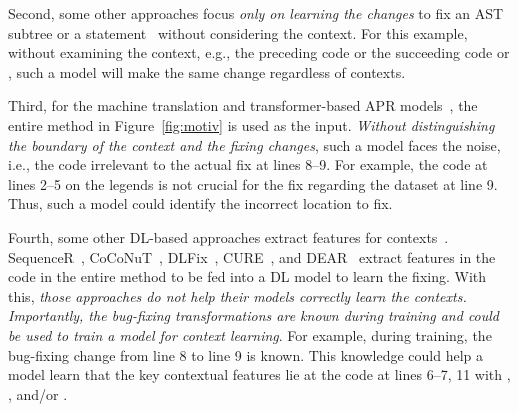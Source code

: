 Second, some other approaches focus {\em only
  on learning the changes} to fix an AST subtree or a
statement~\cite{chakrabortycodit,see2017get} without considering the
context. For this example, without examining the context,
e.g., the preceding code  or the succeeding code
 or ,
such a model will make the same change regardless of contexts.



Third, for the machine translation and transformer-based APR
models~\cite{hata2018learning,tufano2019learning,tufano2018empirical},
the entire method in Figure~\ref{fig:motiv} is used as the input. {\em
  Without distinguishing the boundary of the context and the fixing
  changes}, such a model faces the noise, i.e., the code irrelevant to
the actual fix at lines 8--9. For example, the code at lines 2--5 on
the legends is not crucial for the fix regarding the dataset at line
9. Thus, such a model could identify the incorrect location to fix.





Fourth, some other DL-based approaches extract features for
contexts~\cite{chen2018sequencer,cure-icse21,lutellier2020coconut,icse20,icse22}.
SequenceR~\cite{chen2018sequencer},
CoCoNuT~\cite{lutellier2020coconut}, DLFix~\cite{icse20},
CURE~\cite{cure-icse21}, and DEAR~\cite{icse22} extract features in
the code in the entire method to be fed into a DL model to
learn the fixing. With this, {\em those approaches do not
  help their models correctly learn the contexts. Importantly, the bug-fixing
  transformations are known during training and could
  be used to train a model for context learning}. For example,
during training, the bug-fixing change from line 8 to line 9 is
known. This knowledge could help a model learn that the key contextual
features lie at the code at lines 6--7, 11 with ,
, and/or .



